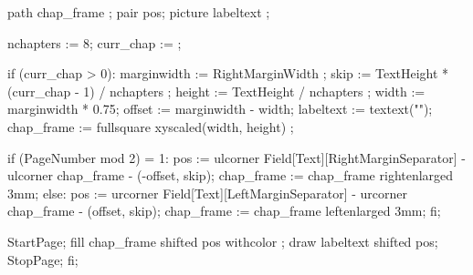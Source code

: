     path chap_frame ;
    pair pos;  
    picture labeltext ;
  
    nchapters := 8;
    curr_chap :=  ; 
  
    if (curr_chap > 0):
           marginwidth := RightMarginWidth ;
           skip   := TextHeight * (curr_chap - 1) / nchapters ;
           height := TextHeight / nchapters ;
           width  := marginwidth * 0.75;
           offset := marginwidth - width;
           labeltext := textext("\ssbfd \thumbindexfontcolor \getmarking[chapternumber]");
           chap_frame := fullsquare xyscaled(width, height) ;

           if (PageNumber mod 2) = 1:
               pos := ulcorner Field[Text][RightMarginSeparator] -
                      ulcorner chap_frame - (-offset, skip);
               chap_frame := chap_frame rightenlarged 3mm;
           else:
               pos := urcorner Field[Text][LeftMarginSeparator] -
                      urcorner chap_frame - (offset, skip);
               chap_frame := chap_frame leftenlarged 3mm;
           fi;

            StartPage;
                fill chap_frame shifted pos withcolor ;
                draw labeltext shifted pos;
            StopPage;
    fi;
\stopuseMPgraphic
